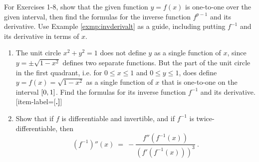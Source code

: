 \divider
\vspace{3mm}
\startexercises\label{sec2dot1}
{\small
{}
\par\noindent For Exercises 1-8, show that the given function $y = f(x)$ is
 one-to-one over the given interval, then find the formulas for the inverse
 function $f^{p-1}$ and its derivative. Use Example \ref{exmp:invderivalt} as a
 guide, including putting $f^{-1}$ and its derivative in terms of $x$.
\begin{enumerate}[item-label={\bfseries \arabic*.}]
 \item The unit circle $x^2 + y^2 = 1$ does not define $y$ as a single function
  of $x$, since $y = \pm \sqrt{1 - x^2}$ defines two separate functions. But
  the part of the unit circle in the first quadrant, i.e. for $0 \le x \le 1$
  and $0 \le y \le 1$, does define $y = f(x) = \sqrt{1 - x^2}$ as a single
  function of $x$ that is one-to-one on the interval $\lbrack 0,1 \rbrack$. Find the
  formulas for its inverse function $f^{-1}$ and its derivative.
[item-label={{[\bfseries \arabic*.]}}]
 \item Show that if $f$ is differentiable and invertible, and if $f^{-1}$ is
  twice-differentiable, then
  \begin{displaymath}
   \left(f^{-1}\right)''(x) ~=~ -\frac{f''(f^{-1}(x))}{\left(f'(f^{-1}(x))\right)^3} ~.
  \end{displaymath}
\end{enumerate}}
\newpage
